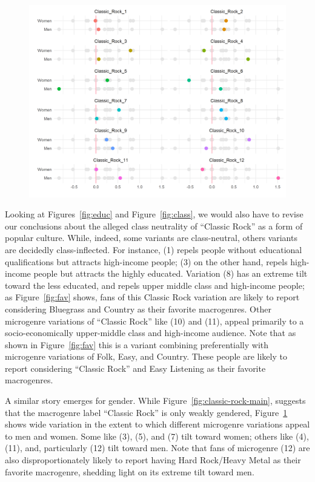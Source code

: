 \documentclass[a4paper,12pt]{extarticle}
\begin{document}
\begin{figure}[ht!]
    \centering
    \includegraphics[width=1.0\textwidth]{Figs/Link Clust/classic-rock-gender.png}
    \caption{}
    \label{fig:gender}
\end{figure}

Looking at Figures~\ref{fig:educ} and Figure~\ref{fig:class}, we would also have to revise our conclusions about the alleged class neutrality of ``Classic Rock'' as a form of popular culture. While, indeed, some variants are class-neutral, others variants are decidedly class-inflected. For instance, (1) repels people without educational qualifications but attracts high-income people; (3) on the other hand, repels high-income people but attracts the highly educated. Variation (8) has an extreme tilt toward the less educated, and repels upper middle class and high-income people; as Figure~\ref{fig:fav} shows, fans of this Classic Rock variation are likely to report considering Bluegrass and Country as their favorite macrogenres. Other microgenre variations of ``Classic Rock'' like (10) and (11), appeal primarily to a socio-economically upper-middle class and high-income audience. Note that as shown in Figure~\ref{fig:fav} this is a variant combining preferentially with microgenre variations of Folk, Easy, and Country. These people are likely to report considering ``Classic Rock'' and Easy Listening as their favorite macrogenres. 

A similar story emerges for gender. While Figure~\ref{fig:classic-rock-main}, suggests that the macrogenre label ``Classic Rock'' is only weakly gendered, Figure~\ref{fig:gender} shows wide variation in the extent to which different microgenre variations appeal to men and women. Some like (3), (5), and (7) tilt toward women; others like (4), (11), and, particularly (12) tilt toward men. Note that fans of microgenre (12) are also disproportionately likely to report having Hard Rock/Heavy Metal as their favorite macrogenre, shedding light on its extreme tilt toward men. 
\end{document}

